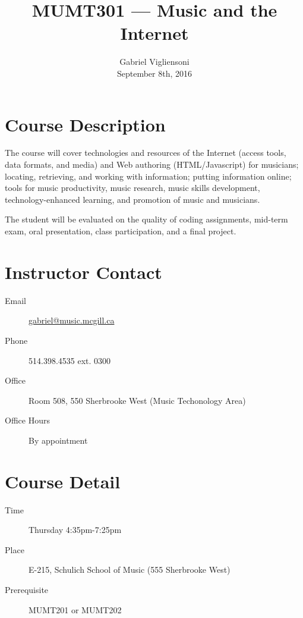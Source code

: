 \documentclass[11pt]{amsart}
\title{MUMT301 --- Music and the Internet}
\author{Gabriel Vigliensoni \\ September 8th, 2016}
\begin{document}
\maketitle
\section{Course Description} 

The course will cover technologies and resources of the Internet (access tools, data formats, and media) and Web authoring (HTML/Javascript) for musicians; locating, retrieving, and working with information; putting information online; tools for music productivity, music research, music skills development, technology-enhanced learning, and promotion of music and musicians. 

The student will be evaluated on the quality of coding assignments, mid-term exam, oral presentation, class participation, and a final project.



\section{Instructor Contact}
\begin{description}
\item[Email]\href{mailto:gabriel@music.mcgill.ca}{gabriel@music.mcgill.ca}
\item [Phone]514.398.4535 ext. 0300
\item [Office]Room 508, 550 Sherbrooke West (Music Techonology Area)
\item [Office Hours]By appointment
\end{description}

\section{Course Detail}
\begin{description}
\item [Time]Thursday 4:35pm-7:25pm
\item [Place]E-215, Schulich School of Music (555 Sherbrooke West)
\item [Prerequisite]MUMT201 or MUMT202
\end{description}
\end{document}
